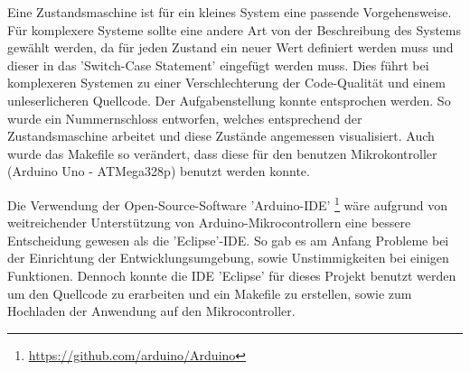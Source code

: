 Eine Zustandsmaschine ist für ein kleines System eine passende Vorgehensweise. Für komplexere Systeme sollte eine andere Art von der Beschreibung des Systems gewählt werden, da für jeden Zustand ein neuer Wert definiert werden muss und dieser in das 'Switch-Case Statement' eingefügt werden muss. Dies führt bei komplexeren Systemen zu einer Verschlechterung der Code-Qualität und einem unleserlicheren Quellcode. Der Aufgabenstellung konnte entsprochen werden. So wurde ein Nummernschloss entworfen, welches entsprechend der Zustandsmaschine arbeitet und diese Zustände angemessen visualisiert. Auch wurde das Makefile so verändert, dass diese für den benutzen Mikrokontroller (Arduino Uno - ATMega328p) benutzt werden konnte.

Die Verwendung der Open-Source-Software 'Arduino-IDE' \footnote{\url{https://github.com/arduino/Arduino}} wäre aufgrund von weitreichender Unterstützung von Arduino-Mikrocontrollern eine bessere Entscheidung gewesen als die 'Eclipse'-IDE. So gab es am Anfang Probleme bei der Einrichtung der Entwicklungsumgebung, sowie Unstimmigkeiten bei einigen Funktionen. Dennoch konnte die IDE 'Eclipse' für dieses Projekt benutzt werden um den Quellcode zu erarbeiten und ein Makefile zu erstellen, sowie zum Hochladen der Anwendung auf den Mikrocontroller.

